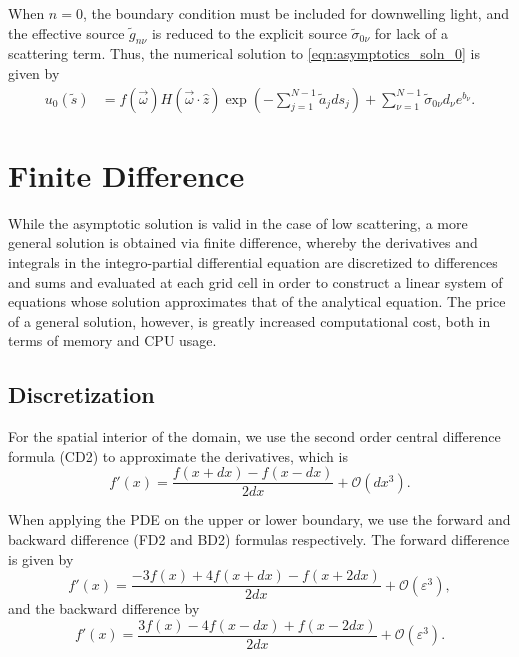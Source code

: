 When $n=0$, the boundary condition must be included for downwelling light,
and the effective source $\tilde{g}_{n\nu}$ is reduced to the explicit source $\tilde{\sigma}_{0\nu}$
for lack of a scattering term.
Thus, the numerical solution to \eqref{eqn:asymptotics_soln_0} is given by
\begin{align}
  u_0(\tilde{s}) &= f(\vec{\omega})H(\vec{\omega}\cdot\hat{z}) \exp\left( -\sum_{j=1}^{N-1}\tilde{a}_jds_j\right)
  + \sum_{\nu=1}^{N-1} \tilde{\sigma}_{0\nu}d_\nu e^{b_\nu}.
\end{align}

\section{Finite Difference}
While the asymptotic solution is valid in the case of low scattering, a more general solution is obtained via finite difference, whereby the derivatives and integrals in the integro-partial differential equation are discretized to differences and sums and evaluated at each grid cell in order to construct a linear system of equations whose solution approximates that of the analytical equation.
The price of a general solution, however, is greatly increased computational cost, both in terms of memory and CPU usage.

\subsection{Discretization}
\label{sec:discretization}

For the spatial interior of the domain, we use the second order central difference formula (CD2) to approximate the derivatives, which is
\begin{equation*}
    f'(x) = \frac{f(x+dx)-f(x-dx)}{2dx} + \mathcal{O}(dx^3).
\end{equation*}

When applying the PDE on the upper or lower boundary, we use the forward and backward difference (FD2 and BD2) formulas respectively.
The forward difference is given by
\begin{equation*}
    \label{eqn:FD2}
    f'(x) = \frac{-3f(x)+4f(x+dx)-f(x+2dx)}{2dx} + \mathcal{O}(\varepsilon^3),
\end{equation*}
and the backward difference by
\begin{equation*}
    \label{eqn:BD2}
    f'(x) = \frac{3f(x)-4f(x-dx)+f(x-2dx)}{2dx} + \mathcal{O}(\varepsilon^3).
\end{equation*}

